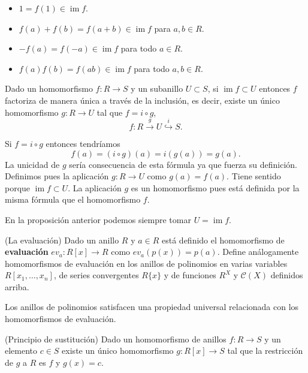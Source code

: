 
\begin{itemize}
\item
  \(1=f(1)\in \operatorname{im} f\).
\item
  \(f(a)+f(b)=f(a+b)\in \operatorname{im} f\) para \(a,b\in R\).
\item
  \(-f(a)=f(-a)\in \operatorname{im} f\) para todo \(a\in R\).
\item
  \(f(a)f(b)=f(ab)\in \operatorname{im} f\) para todo \(a,b\in R\).
\end{itemize}


\label{factorimage} Dado un homomorfismo
\(f\colon R\rightarrow S\) y un subanillo \(U\subset S\), si
\(\operatorname{im} f\subset U\) entonces \(f\) factoriza de manera
única a través de la inclusión, es decir, existe un único homomorfismo
\(g\colon R\rightarrow U\) tal que \(f=i\circ g\),
\[f\colon R\stackrel{g}\rightarrow U\stackrel{i}\hookrightarrow S.\]


Si \(f=i\circ g\) entonces tendríamos
\[f(a)=(i\circ g)(a)=i(g(a))=g(a).\] La unicidad de \(g\) sería
consecuencia de esta fórmula ya que fuerza su definición. Definimos pues
la aplicación \(g\colon R\rightarrow U\) como \(g(a)=f(a)\). Tiene
sentido porque \(\operatorname{im}f\subset U\). La aplicación \(g\) es
un homomorfismo pues está definida por la misma fórmula que el
homomorfismo \(f\).\\


En la proposición anterior podemos siempre tomar
\(U=\operatorname{im} f\). 

\textrm{\normalfont (La evaluación)} Dado un anillo \(R\)
y \(a\in R\) está definido el homomorfismo de \textbf{evaluación}
\(ev_a\colon R[x]\rightarrow R\) como \(ev_a(p(x))=p(a)\). Define
análogamente homomorfismos de evaluación en los anillos de polinomios en
varias variables \(R[x_1,\dots, x_n]\), de series convergentes
\(R\{x\}\) y de funciones \(R^X\) y \(\mathcal C(X)\) definidos
arriba. 

Los anillos de polinomios satisfacen una propiedad universal relacionada
con los homomorfismos de evaluación.

\textrm{\normalfont (Principio de sustitución)} Dado un
homomorfismo de anillos \(f\colon R\rightarrow S\) y un elemento
\(c\in S\) existe un único homomorfismo \(g\colon R[x]\rightarrow S\)
tal que la restricción de \(g\) a \(R\) es \(f\) y \(g(x)=c\).

